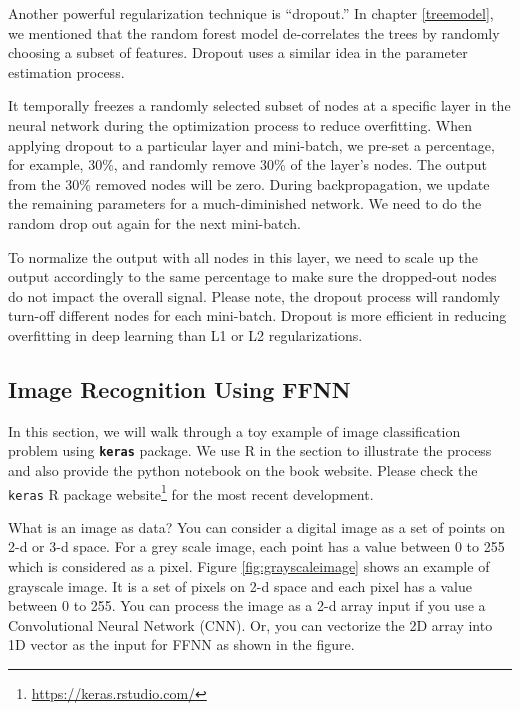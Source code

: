 \documentclass[
  12pt,
]{krantz}
\renewcommand{\href}[2]{#2\footnote{\url{#1}}}
\begin{document}
Another powerful regularization technique is ``dropout.'' In chapter \ref{treemodel}, we mentioned that the random forest model de-correlates the trees by randomly choosing a subset of features. Dropout uses a similar idea in the parameter estimation process.

It temporally freezes a randomly selected subset of nodes at a specific layer in the neural network during the optimization process to reduce overfitting. When applying dropout to a particular layer and mini-batch, we pre-set a percentage, for example, 30\%, and randomly remove 30\% of the layer's nodes. The output from the 30\% removed nodes will be zero. During backpropagation, we update the remaining parameters for a much-diminished network. We need to do the random drop out again for the next mini-batch.

To normalize the output with all nodes in this layer, we need to scale up the output accordingly to the same percentage to make sure the dropped-out nodes do not impact the overall signal. Please note, the dropout process will randomly turn-off different nodes for each mini-batch. Dropout is more efficient in reducing overfitting in deep learning than L1 or L2 regularizations.

\hypertarget{ffnnexample}{%
\subsection{Image Recognition Using FFNN}\label{ffnnexample}}

In this section, we will walk through a toy example of image classification problem using \textbf{\texttt{keras}} package. We use R in the section to illustrate the process and also provide the python notebook on the book website. Please check the \href{https://keras.rstudio.com/}{\texttt{keras} R package website} for the most recent development.

What is an image as data? You can consider a digital image as a set of points on 2-d or 3-d space. For a grey scale image, each point has a value between 0 to 255 which is considered as a pixel. Figure \ref{fig:grayscaleimage} shows an example of grayscale image. It is a set of pixels on 2-d space and each pixel has a value between 0 to 255. You can process the image as a 2-d array input if you use a Convolutional Neural Network (CNN). Or, you can vectorize the 2D array into 1D vector as the input for FFNN as shown in the figure.
\end{document}
